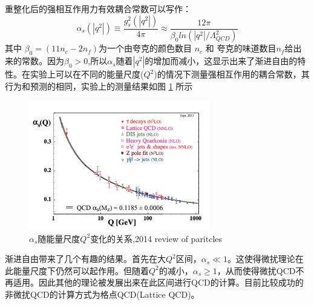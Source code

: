 重整化后的强相互作用力有效耦合常数可以写作：
\begin{equation}
    \alpha_{s}(|q^2|) \equiv \frac{g_s^2(|q^2|)}{4\pi} \approx \frac{12\pi}{\beta_0 ln(|q^2|/\Lambda_{QCD}^2)}
\end{equation}
其中 $\beta_0 = (11n_c-2n_f)$为一个由夸克的颜色数目 $n_c$ 和 夸克的味道数目$n_f$给出来的常数。因为$\beta_0 > 0$,所以$\alpha_{s}$随着$|q^2|$的增加而减小，这显示出来了渐进自由的特性。在实验上可以在不同的能量尺度($Q^2$)的情况下测量强相互作用的耦合常数，其行为和预测的相同，实验上的测量结果如图 \ref{fig:Alpha_S} 所示
\begin{figure}[htb]
    \begin{center}
    \includegraphics[width=0.7\textwidth,clip]{figures/Chapter1/Alpha_s.png}
    \end{center}
    \caption[$\alpha_s$随能量尺度$Q^2$变化的关系]{$\alpha_s$随能量尺度$Q^2$变化的关系,2014 review of paritcles}
    \label{fig:Alpha_S}
\end{figure}

渐进自由带来了几个有趣的结果。首先在大$Q^2$区间，$\alpha_s \ll 1$。这使得微扰理论在此能量尺度下仍然可以起作用。但随着$Q^2$的减小，$\alpha_s \geq 1$，从而使得微扰QCD不再适用。因此其他的理论被发展出来在此区间进行QCD的计算。目前比较成功的非微扰QCD的计算方式为格点QCD(Lattice QCD)。